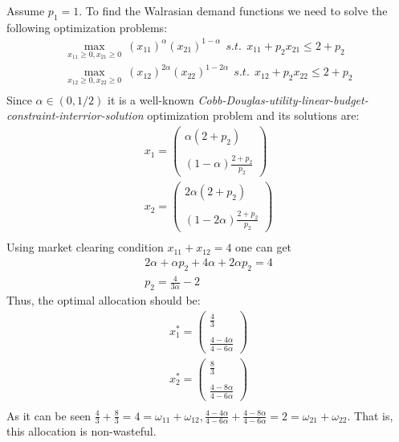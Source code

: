 \documentclass[a4paper]{article}
\begin{document}
Assume $p_1 = 1$. To find the Walrasian demand functions we need to solve the following optimization problems:
\begin{align*}
\underset{x_{11} \ge 0, x_{21}\ge 0}{\max}\ (x_{11})^{\alpha}(x_{21})^{1-\alpha}\ \ s.t.\ \ x_{11} + p_2x_{21} \le 2 + p_2\\
\underset{x_{12} \ge 0, x_{22} \ge 0}{\max}\ (x_{12})^{2\alpha}(x_{22})^{1-2\alpha}\ \ s.t.\ \ x_{12} + p_2x_{22} \le 2 + p_2\\
\end{align*}
Since $\alpha \in (0, 1/2)$ it is a well-known \textit{Cobb-Douglas-utility-linear-budget-constraint-interrior-solution} optimization problem and its solutions are:
\begin{align*}
x_1 = \begin{pmatrix}
\alpha (2 + p_2)\\
\\
(1-\alpha)\frac{2+p_2}{p_2}
\end{pmatrix}\\
x_2 = \begin{pmatrix}
2\alpha (2 + p_2)\\
\\
(1-2\alpha)\frac{2+p_2}{p_2}
\end{pmatrix}\\
\end{align*}
Using market clearing condition $x_{11} + x_{12} = 4$ one can get
\begin{align*}
2\alpha + \alpha p_2 + 4\alpha + 2\alpha p_2 = 4\\
p_2 = \frac{4}{3\alpha} - 2
\end{align*}
Thus, the optimal allocation should be: 
\begin{align*}
x_1^* = \begin{pmatrix}
\frac{4}{3}\\
\\
\frac{4 - 4\alpha}{4 - 6\alpha}
\end{pmatrix}\\
x_2^* = \begin{pmatrix}
\frac{8}{3}\\
\\
\frac{4 - 8\alpha}{4 - 6\alpha}
\end{pmatrix}\\
\end{align*}
As it can be seen $\frac{4}{3} + \frac{8}{3} = 4 = \omega_{11} + \omega_{12}, \frac{4-4\alpha}{4 - 6\alpha} + \frac{4 - 8 \alpha}{4 - 6\alpha} = 2 = \omega_{21} + \omega_{22}$. That is, this allocation is non-wasteful.
\end{document}
